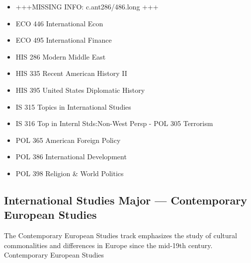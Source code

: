\documentclass[
  letterpaper,
]{scrbook}
\providecommand{\tightlist}{%
  \setlength{\itemsep}{0pt}\setlength{\parskip}{0pt}}
\begin{document}
\begin{enumerate}
\begin{enumerate}
    \begin{itemize}
    \tightlist
    \item
      +++MISSING INFO: c.ant286/486.long +++
    \item
      ECO 446 International Econ
    \item
      ECO 495 International Finance
    \item
      HIS 286 Modern Middle East
    \item
      HIS 335 Recent American History II
    \item
      HIS 395 United States Diplomatic History
    \item
      IS 315 Topics in International Studies
    \item
      IS 316 Top in Internl Stds:Non-West Persp - POL 305 Terrorism
    \item
      POL 365 American Foreign Policy
    \item
      POL 386 International Development
    \item
      POL 398 Religion \& World Politics
    \end{itemize}
  \end{enumerate}
\end{enumerate}

\subsection{International Studies Major --- Contemporary European
Studies}\label{international-studies-major-contemporary-european-studies}

The Contemporary European Studies track emphasizes the study of cultural
commonalities and differences in Europe since the mid-19th century.
Contemporary European Studies
\end{document}
